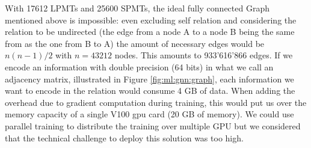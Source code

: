 \documentclass[../main.tex]{subfiles}
\begin{document}
With 17612 LPMTs and 25600 SPMTs, the ideal fully connected Graph mentioned above is impossible: even excluding self relation and considering the relation to be undirected (the edge from a node A to a node B being the same from
as the one from B to A) the amount of necessary edges would be $n(n-1)/2$ with $n = 43212$
nodes. This amounts to 933'616'866 edges. If we encode an information with double precision (64 bits) in what we call an adjacency matrix, illustrated in Figure \ref{fig:ml:gnn:graph}, each information we want to encode in the relation would consume 4 GB of data. When adding the overhead due to gradient computation during training, this would put us over the memory capacity of a single V100 gpu card (20 GB of memory).
We could use parallel training to distribute the training over multiple GPU but we considered that the technical challenge to deploy this solution was too high.



\end{document}
